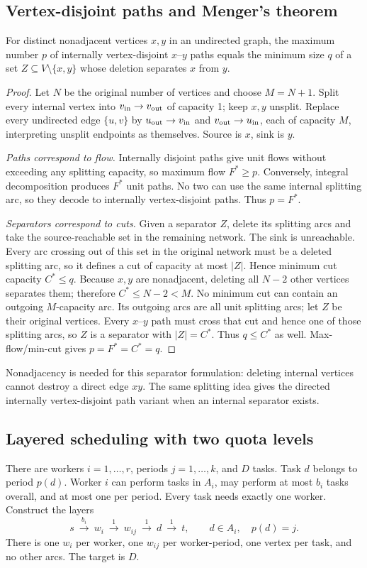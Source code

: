 \subsection{Vertex-disjoint paths and Menger's theorem}\label{nf:menger}
\begin{theorem}
For distinct nonadjacent vertices $x,y$ in an undirected graph, the maximum
number $p$ of internally vertex-disjoint $x$--$y$ paths equals the minimum
size $q$ of a set $Z\subseteq V\setminus\{x,y\}$ whose deletion separates
$x$ from $y$.
\end{theorem}
\begin{proof}
Let $N$ be the original number of vertices and choose $M=N+1$.
Split every internal vertex into $v_{\rm in}\to v_{\rm out}$ of capacity 1;
keep $x,y$ unsplit. Replace every undirected edge $\{u,v\}$ by
$u_{\rm out}\to v_{\rm in}$ and $v_{\rm out}\to u_{\rm in}$, each of capacity
$M$, interpreting unsplit endpoints as themselves. Source is $x$, sink is $y$.

\emph{Paths correspond to flow.} Internally disjoint paths give unit flows
without exceeding any splitting capacity, so maximum flow $F^*\ge p$.
Conversely, integral decomposition produces $F^*$ unit paths. No two can use
the same internal splitting arc, so they decode to internally vertex-disjoint
paths. Thus $p=F^*$.

\emph{Separators correspond to cuts.} Given a separator $Z$, delete its
splitting arcs and take the source-reachable set in the remaining network.
The sink is unreachable. Every arc crossing out of this set in the original
network must be a deleted splitting arc, so it defines a cut of capacity at
most $|Z|$. Hence minimum cut capacity $C^*\le q$.
Because $x,y$ are nonadjacent, deleting all $N-2$ other vertices separates
them; therefore $C^*\le N-2<M$. No minimum cut can contain an outgoing
$M$-capacity arc. Its outgoing arcs are all unit splitting arcs; let $Z$
be their original vertices. Every $x$--$y$ path must cross that cut and hence
one of those splitting arcs, so $Z$ is a separator with $|Z|=C^*$.
Thus $q\le C^*$ as well. Max-flow/min-cut gives $p=F^*=C^*=q$.
\end{proof}
Nonadjacency is needed for this separator formulation: deleting internal
vertices cannot destroy a direct edge $xy$. The same splitting idea gives
the directed internally vertex-disjoint path variant when an internal
separator exists.

\subsection{Layered scheduling with two quota levels}\label{nf:scheduling}
There are workers $i=1,\ldots,r$, periods $j=1,\ldots,k$, and $D$ tasks.
Task $d$ belongs to period $p(d)$. Worker $i$ can perform tasks in $A_i$,
may perform at most $b_i$ tasks overall, and at most one per period.
Every task needs exactly one worker. Construct the layers
\[
 s\ \xrightarrow{\ b_i\ }\ w_i
 \ \xrightarrow{\ 1\ }\ w_{ij}
 \ \xrightarrow{\ 1\ }\ d
 \ \xrightarrow{\ 1\ }\ t,
 \qquad d\in A_i,\quad p(d)=j.
\]
There is one $w_i$ per worker, one $w_{ij}$ per worker-period, one vertex per
task, and no other arcs. The target is $D$.


